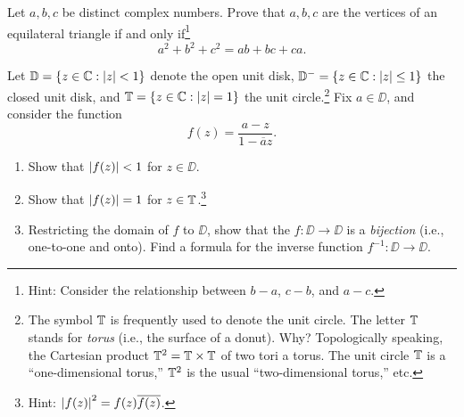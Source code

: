 \documentclass{../math135}
\begin{document}
\begin{exercise}\label{ExerciseInscribed}
	Let \(a,b,c\) be distinct complex numbers.  Prove that \(a,b,c\) are
  the vertices of an equilateral triangle if and only
  if\footnote{Hint: Consider the relationship between \(b-a\),
    \(c-b\), and \(a-c\).}
	\begin{equation}\label{eq-TriangleEquation}
		a^2 + b^2 + c^2 = ab+bc+ca.
	\end{equation}

  \begin{solution}
  \end{solution}

\end{exercise}

\begin{exercise}
	Let \(\DD = \{ z\in \CC : \abs z < 1\}\) denote the open unit disk,
  \(\DD^- = \{ z \in \CC: \abs z \leq 1\}\) the closed unit disk, and
  \(\TT = \{ z \in \CC : \abs z =1\}\) the unit circle.\footnote{The
    symbol \(\TT\) is frequently used to denote the unit circle.  The
    letter \(\TT\) stands for \emph{torus} (i.e., the surface of a
    donut).  Why?  Topologically speaking, the Cartesian product
    \(\TT^2 = \TT \times \TT\) of two tori a torus.  The unit circle
    \(\TT\) is a ``one-dimensional torus,'' \(\TT^2\) is the usual
    ``two-dimensional torus,'' etc.}  Fix \(a \in \DD\), and consider
  the function
	\begin{equation}\label{eq-Blaschke}
		f(z) = \frac{a-z}{1 - \overline{a} z}.
	\end{equation}
	\begin{enumerate}
	\item Show that \(\abs*{f(z)} <1\) for \(z \in \DD\).

    \begin{solution}
    \end{solution}

	\item Show that \(\abs*{f(z)} = 1\) for \(z \in \TT\).\footnote{Hint:
      \(\abs*{f(z)}^2 = f(z) \overline{f(z)}\).}

    \begin{solution}
    \end{solution}

	\item Restricting the domain of \(f\) to \(\DD\), show that the
    \(f \colon \DD\to\DD\) is a \emph{bijection} (i.e., one-to-one and onto).
    Find a formula for the inverse function
    \(f^{-1} \colon \DD\to\DD\).

    \begin{solution}
    \end{solution}

	\end{enumerate}
\end{exercise}
\end{document}
